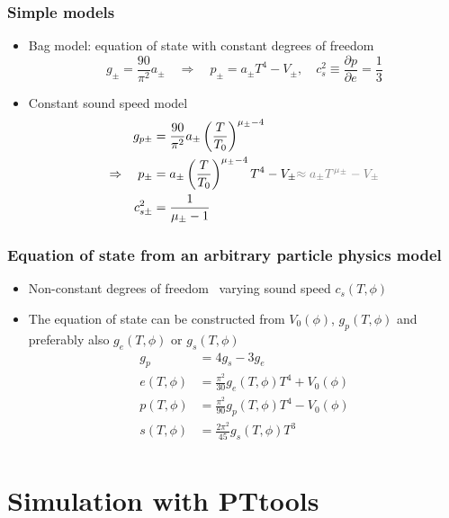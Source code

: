\begin{frame}
    \frametitle{Simple models}
    \begin{itemize}
        \item Bag model: equation of state with constant degrees of freedom
        \begin{equation}
            g_\pm = \frac{90}{\pi^2} a_\pm \quad \Rightarrow \quad p_\pm = a_\pm T^4 - V_\pm, \quad
            c_s^2 \equiv \frac{\partial p}{\partial e} = \frac{1}{3}
        \end{equation}
        \item Constant sound speed model
        \begin{align}
            g_{p\pm} &= \frac{90}{\pi^2} a_\pm \left( \frac{T}{T_0} \right)^{\mu_\pm - 4} \\
            \Rightarrow \quad
            p_\pm &= a_\pm \left( \frac{T}{T_0} \right)^{\mu_\pm - 4} T^4 - V_\pm {\color{gray} \approx a_\pm T^{\mu_\pm} - V_\pm } \\
            c_{s\pm}^2 &= \frac{1}{\mu_\pm - 1}
        \end{align}
    \end{itemize}
\end{frame}

\begin{frame}
    \frametitle{Equation of state from an arbitrary particle physics model}
    \begin{itemize}
        \item Non-constant degrees of freedom \textrightarrow \ varying sound speed $c_s(T,\phi)$
        \item The equation of state can be constructed from $V_0(\phi)$, $g_p(T,\phi)$ and preferably also $g_e(T,\phi)$ or $g_s(T,\phi)$
        \begin{align}
            g_p &= 4g_s - 3g_e \\
            e(T,\phi) &= \frac{\pi^2}{30} g_e(T,\phi) T^4 + V_0(\phi) \\
            p(T,\phi) &= \frac{\pi^2}{90} g_p(T,\phi) T^4 - V_0(\phi) \\
            s(T,\phi) &= \frac{2\pi^2}{45} g_s(T,\phi) T^3 \\
        \end{align}
    \end{itemize}
\end{frame}

\section{Simulation with PTtools}

